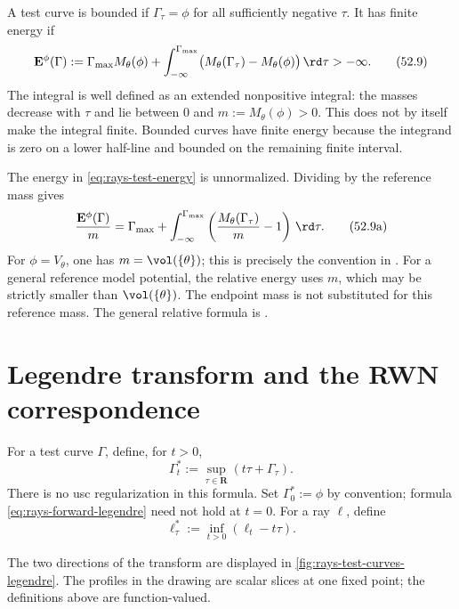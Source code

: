 A test curve is bounded if $\Gamma_\tau=\phi$ for all sufficiently
negative $\tau$.  It has finite energy if
\[
 \mathbf E^\phi(\Gamma)
 :=\Gamma_{\max}M_\theta(\phi)
 +\int_{-\infty}^{\Gamma_{\max}}
       \bigl(M_\theta(\Gamma_\tau)-M_\theta(\phi)\bigr)\,\rd \tau
 >-\infty .
\tag{52.9}\label{eq:rays-test-energy}
\]
The integral is well defined as an extended nonpositive integral:
the masses decrease with $\tau$ and lie between $0$ and
$m:=M_\theta(\phi)>0$.  This does not by itself make the integral
finite.  Bounded curves have finite energy because the integrand
is zero on a lower half-line and bounded on the remaining finite
interval.

The energy in \eqref{eq:rays-test-energy} is unnormalized.
Dividing by the reference mass gives
\[
 \frac{\mathbf E^\phi(\Gamma)}{m}
 =\Gamma_{\max}+
   \int_{-\infty}^{\Gamma_{\max}}
      \left(\frac{M_\theta(\Gamma_\tau)}{m}-1\right)\,\rd\tau.
\tag{52.9a}\label{eq:rays-normalized-test-energy}
\]
For $\phi=V_\theta$, one has $m=\vol(\{\theta\})$; this is precisely
the convention in \cite[equation~(5)]{DXZ23}.
For a general reference model potential, the relative energy
uses $m$, which may be strictly smaller than $\vol(\{\theta\})$.
The endpoint mass is not substituted for this reference mass.
The general relative formula is
\cite[equation~(9.5)]{XiaBook}.


\section{Legendre transform and the RWN correspondence}
\label{sec:rays-legendre}

\begin{definition}
\label{def:rays-legendre}
For a test curve $\Gamma$, define, for $t>0$,
\[
                 \Gamma_t^*
 :=\sup_{\tau\in\mathbf R}(t\tau+\Gamma_\tau).
\tag{52.10}\label{eq:rays-forward-legendre}
\]
There is no usc regularization in this formula.  Set
$\Gamma_0^*:=\phi$ by convention; formula
\eqref{eq:rays-forward-legendre} need not hold at $t=0$.
For a ray $\ell$, define
\[
                 \ell_\tau^*
 :=\inf_{t>0}(\ell_t-t\tau).
\tag{52.11}\label{eq:rays-inverse-legendre}
\]
\end{definition}

The two directions of the transform are displayed in
\cref{fig:rays-test-curves-legendre}.  The profiles in the drawing are scalar
slices at one fixed point; the definitions above are function-valued.

